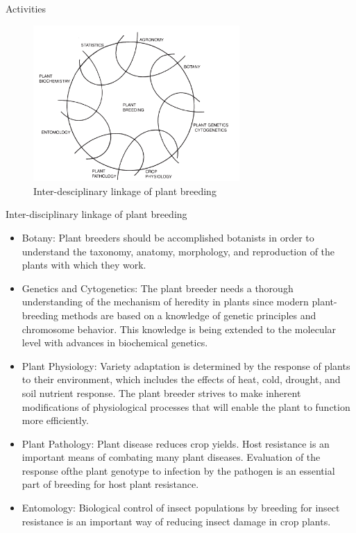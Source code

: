 \documentclass[11pt,ignorenonframetext,aspectratio=169]{beamer}
\providecommand{\tightlist}{%
  \setlength{\itemsep}{0pt}\setlength{\parskip}{0pt}}
\begin{document}
\begin{frame}{Activities}
\protect\hypertarget{activities}{}
\begin{figure}
\includegraphics[width=0.7\textwidth,keepaspectratio,height=0.6\textheight]{./images/interdisciplinary_science} \caption{Inter-desciplinary linkage of plant breeding}\label{fig:plb-disciplines}
\end{figure}
\end{frame}

\begin{frame}{Inter-disciplinary linkage of plant breeding
\autocite{poehlman1987breeding}}
\protect\hypertarget{inter-disciplinary-linkage-of-plant-breeding-poehlman1987breeding}{}
\small

\begin{itemize}
\tightlist
\item
  Botany: Plant breeders should be accomplished botanists in order to
  understand the taxonomy, anatomy, morphology, and reproduction of the
  plants with which they work.
\item
  Genetics and Cytogenetics: The plant breeder needs a thorough
  understanding of the mechanism of heredity in plants since modern
  plant-breeding methods are based on a knowledge of genetic principles
  and chromosome behavior. This knowledge is being extended to the
  molecular level with advances in biochemical genetics.
\item
  Plant Physiology: Variety adaptation is determined by the response of
  plants to their environment, which includes the effects of heat, cold,
  drought, and soil nutrient response. The plant breeder strives to make
  inherent modifications of physiological processes that will enable the
  plant to function more efficiently.
\item
  Plant Pathology: Plant disease reduces crop yields. Host resistance is
  an important means of combating many plant diseases. Evaluation of the
  response ofthe plant genotype to infection by the pathogen is an
  essential part of breeding for host plant resistance.
\item
  Entomology: Biological control of insect populations by breeding for
  insect resistance is an important way of reducing insect damage in
  crop plants.
\end{itemize}
\end{frame}
\end{document}
